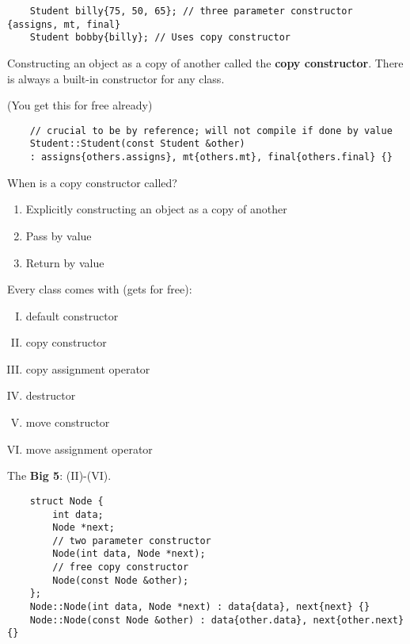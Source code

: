 \begin{lstlisting}
    Student billy{75, 50, 65}; // three parameter constructor {assigns, mt, final}
    Student bobby{billy}; // Uses copy constructor
\end{lstlisting}
Constructing an object as a copy of another called the \textbf{copy constructor}.
There is always a built-in constructor for any class.

 (You get this for free already)
\begin{lstlisting}
    // crucial to be by reference; will not compile if done by value
    Student::Student(const Student &other)
    : assigns{others.assigns}, mt{others.mt}, final{others.final} {}
\end{lstlisting}
When is a copy constructor called?
\begin{enumerate}[(1)]
    \item Explicitly constructing an object as a copy of another
    \item Pass by value
    \item Return by value
\end{enumerate}
Every class comes with (gets for free):
\begin{enumerate}[(I)]
    \item default constructor
    \item copy constructor
    \item copy assignment operator
    \item destructor
    \item move constructor
    \item move assignment operator
\end{enumerate}
The \textbf{Big 5}: (II)-(VI).

\begin{lstlisting}
    struct Node {
        int data;
        Node *next;
        // two parameter constructor
        Node(int data, Node *next);
        // free copy constructor
        Node(const Node &other);
    };
    Node::Node(int data, Node *next) : data{data}, next{next} {}
    Node::Node(const Node &other) : data{other.data}, next{other.next} {}
\end{lstlisting}

